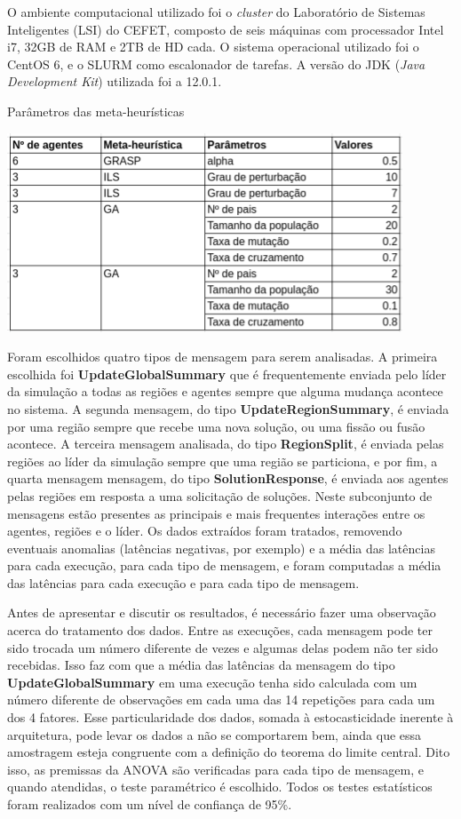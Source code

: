 O ambiente computacional utilizado foi o \textit{cluster} do Laboratório de Sistemas Inteligentes (LSI) do CEFET, composto de seis máquinas com processador Intel i7, 32GB de RAM e 2TB de HD cada. O sistema operacional utilizado foi o CentOS 6, e o SLURM como escalonador
de tarefas. A versão do JDK (\textit{Java Development Kit}) utilizada foi a 12.0.1.

\begin{quadro}
\caption{\label{tab:expS}Parâmetros das meta-heurísticas}
\centering
\includegraphics[scale=0.8]{imagens/d-optimas-exp-config.png}
\end{quadro}

Foram escolhidos quatro tipos de mensagem para serem analisadas. A primeira escolhida foi \textbf{UpdateGlobalSummary} que é frequentemente enviada pelo líder da simulação a todas as regiões e agentes sempre que alguma mudança acontece no sistema. A segunda mensagem, do tipo \textbf{UpdateRegionSummary}, é enviada por uma região sempre que recebe uma nova solução, ou uma fissão ou fusão acontece. A terceira mensagem analisada, do tipo \textbf{RegionSplit}, é enviada pelas regiões ao líder da simulação sempre que uma região se particiona, e por fim, a quarta mensagem mensagem, do tipo \textbf{SolutionResponse}, é enviada aos agentes pelas regiões em resposta a uma solicitação de soluções. Neste subconjunto de mensagens  estão presentes as principais e mais frequentes interações entre os agentes, regiões e o líder. Os dados extraídos foram tratados, removendo eventuais anomalias (latências negativas, por exemplo) e a média das latências para cada execução, para cada tipo de mensagem, e foram computadas a média das latências para cada execução e para cada tipo de mensagem. 

Antes de apresentar e discutir os resultados, é necessário fazer uma observação acerca do tratamento dos dados. Entre as execuções, cada mensagem pode ter sido trocada um número diferente de vezes e algumas delas podem não ter sido recebidas. Isso faz com que a média das latências da mensagem do tipo \textbf{UpdateGlobalSummary} em uma execução tenha sido calculada com um número diferente de observações em cada uma das 14 repetições para cada um dos 4 fatores. Esse particularidade dos dados, somada à estocasticidade inerente à arquitetura, pode levar os dados a não se comportarem bem, ainda que essa amostragem esteja congruente com a definição do teorema do limite central. Dito isso, as premissas da ANOVA são verificadas para cada tipo de mensagem, e quando atendidas, o teste paramétrico é escolhido. Todos os testes estatísticos foram realizados com um nível de confiança de 95\%.



